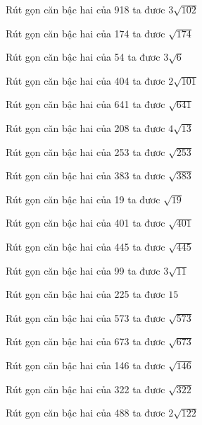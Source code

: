 \documentclass[12pt,a4paper]{article}
\begin{document}
\begin{ex}
Rút gọn căn bậc hai của 918 ta đươc $3\sqrt{102}$
\end{ex}
\begin{ex}
Rút gọn căn bậc hai của 174 ta đươc $\sqrt{174}$
\end{ex}
\begin{ex}
Rút gọn căn bậc hai của 54 ta đươc $3\sqrt{6}$
\end{ex}
\begin{ex}
Rút gọn căn bậc hai của 404 ta đươc $2\sqrt{101}$
\end{ex}
\begin{ex}
Rút gọn căn bậc hai của 641 ta đươc $\sqrt{641}$
\end{ex}
\begin{ex}
Rút gọn căn bậc hai của 208 ta đươc $4\sqrt{13}$
\end{ex}
\begin{ex}
Rút gọn căn bậc hai của 253 ta đươc $\sqrt{253}$
\end{ex}
\begin{ex}
Rút gọn căn bậc hai của 383 ta đươc $\sqrt{383}$
\end{ex}
\begin{ex}
Rút gọn căn bậc hai của 19 ta đươc $\sqrt{19}$
\end{ex}
\begin{ex}
Rút gọn căn bậc hai của 401 ta đươc $\sqrt{401}$
\end{ex}
\begin{ex}
Rút gọn căn bậc hai của 445 ta đươc $\sqrt{445}$
\end{ex}
\begin{ex}
Rút gọn căn bậc hai của 99 ta đươc $3\sqrt{11}$
\end{ex}
\begin{ex}
Rút gọn căn bậc hai của 225 ta đươc $15$
\end{ex}
\begin{ex}
Rút gọn căn bậc hai của 573 ta đươc $\sqrt{573}$
\end{ex}
\begin{ex}
Rút gọn căn bậc hai của 673 ta đươc $\sqrt{673}$
\end{ex}
\begin{ex}
Rút gọn căn bậc hai của 146 ta đươc $\sqrt{146}$
\end{ex}
\begin{ex}
Rút gọn căn bậc hai của 322 ta đươc $\sqrt{322}$
\end{ex}
\begin{ex}
Rút gọn căn bậc hai của 488 ta đươc $2\sqrt{122}$
\end{ex}
\end{document}
